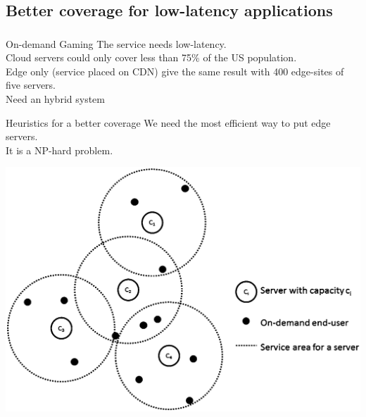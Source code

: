 \documentclass[utf8,xcolor=table, page number]{earlywinter}
\begin{document}
\subsection{Better coverage for low-latency applications}
\begin{frame}
  \frametitle{\secname}
  \framesubtitle{\subsecname}

  \begin{exampleblock}{On-demand Gaming}
    The service needs low-latency.\\
    Cloud servers could only cover less than 75\% of the US population.\\
    Edge only (service placed on CDN) give the same result with 400 edge-sites of five servers.\\
    Need an hybrid system
  \end{exampleblock}

  \begin{minipage}[l]{0.45\linewidth}
    \begin{alertblock}{Heuristics for a better coverage}
      We need the most efficient way to put edge servers.\\
      It is a NP-hard problem.
    \end{alertblock}
  \end{minipage}
  \begin{minipage}[l]{0.5\linewidth}
  \begin{center}
  \includegraphics[width=\linewidth]{coverage}
  \end{center}
  \end{minipage}
  
\end{frame}
\end{document}
